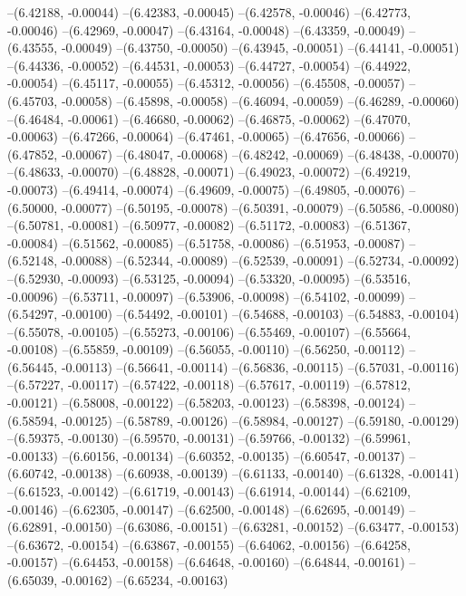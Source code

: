 --(6.42188, -0.00044)
--(6.42383, -0.00045)
--(6.42578, -0.00046)
--(6.42773, -0.00046)
--(6.42969, -0.00047)
--(6.43164, -0.00048)
--(6.43359, -0.00049)
--(6.43555, -0.00049)
--(6.43750, -0.00050)
--(6.43945, -0.00051)
--(6.44141, -0.00051)
--(6.44336, -0.00052)
--(6.44531, -0.00053)
--(6.44727, -0.00054)
--(6.44922, -0.00054)
--(6.45117, -0.00055)
--(6.45312, -0.00056)
--(6.45508, -0.00057)
--(6.45703, -0.00058)
--(6.45898, -0.00058)
--(6.46094, -0.00059)
--(6.46289, -0.00060)
--(6.46484, -0.00061)
--(6.46680, -0.00062)
--(6.46875, -0.00062)
--(6.47070, -0.00063)
--(6.47266, -0.00064)
--(6.47461, -0.00065)
--(6.47656, -0.00066)
--(6.47852, -0.00067)
--(6.48047, -0.00068)
--(6.48242, -0.00069)
--(6.48438, -0.00070)
--(6.48633, -0.00070)
--(6.48828, -0.00071)
--(6.49023, -0.00072)
--(6.49219, -0.00073)
--(6.49414, -0.00074)
--(6.49609, -0.00075)
--(6.49805, -0.00076)
--(6.50000, -0.00077)
--(6.50195, -0.00078)
--(6.50391, -0.00079)
--(6.50586, -0.00080)
--(6.50781, -0.00081)
--(6.50977, -0.00082)
--(6.51172, -0.00083)
--(6.51367, -0.00084)
--(6.51562, -0.00085)
--(6.51758, -0.00086)
--(6.51953, -0.00087)
--(6.52148, -0.00088)
--(6.52344, -0.00089)
--(6.52539, -0.00091)
--(6.52734, -0.00092)
--(6.52930, -0.00093)
--(6.53125, -0.00094)
--(6.53320, -0.00095)
--(6.53516, -0.00096)
--(6.53711, -0.00097)
--(6.53906, -0.00098)
--(6.54102, -0.00099)
--(6.54297, -0.00100)
--(6.54492, -0.00101)
--(6.54688, -0.00103)
--(6.54883, -0.00104)
--(6.55078, -0.00105)
--(6.55273, -0.00106)
--(6.55469, -0.00107)
--(6.55664, -0.00108)
--(6.55859, -0.00109)
--(6.56055, -0.00110)
--(6.56250, -0.00112)
--(6.56445, -0.00113)
--(6.56641, -0.00114)
--(6.56836, -0.00115)
--(6.57031, -0.00116)
--(6.57227, -0.00117)
--(6.57422, -0.00118)
--(6.57617, -0.00119)
--(6.57812, -0.00121)
--(6.58008, -0.00122)
--(6.58203, -0.00123)
--(6.58398, -0.00124)
--(6.58594, -0.00125)
--(6.58789, -0.00126)
--(6.58984, -0.00127)
--(6.59180, -0.00129)
--(6.59375, -0.00130)
--(6.59570, -0.00131)
--(6.59766, -0.00132)
--(6.59961, -0.00133)
--(6.60156, -0.00134)
--(6.60352, -0.00135)
--(6.60547, -0.00137)
--(6.60742, -0.00138)
--(6.60938, -0.00139)
--(6.61133, -0.00140)
--(6.61328, -0.00141)
--(6.61523, -0.00142)
--(6.61719, -0.00143)
--(6.61914, -0.00144)
--(6.62109, -0.00146)
--(6.62305, -0.00147)
--(6.62500, -0.00148)
--(6.62695, -0.00149)
--(6.62891, -0.00150)
--(6.63086, -0.00151)
--(6.63281, -0.00152)
--(6.63477, -0.00153)
--(6.63672, -0.00154)
--(6.63867, -0.00155)
--(6.64062, -0.00156)
--(6.64258, -0.00157)
--(6.64453, -0.00158)
--(6.64648, -0.00160)
--(6.64844, -0.00161)
--(6.65039, -0.00162)
--(6.65234, -0.00163)
